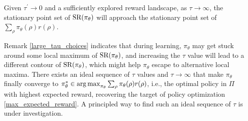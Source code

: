 \begin{remk}
\label{large_tau_choices}
	Given $\tau^{\prime} \to 0$ and a sufficiently explored reward landscape, as $\tau \to \infty$, the stationary point set of $\text{SR}(\pi_\theta)$ will approach the stationary point set of $\sum_{\rho}{ \pi_\theta(\rho) r(\rho) }$.
\end{remk}
 
Remark \ref{large_tau_choices} indicates that during learning, $\pi_\theta$ may get stuck around some local maximum of $\text{SR}(\pi_\theta)$, and increasing the $\tau$ value will lead to a different contour of $\text{SR}(\pi_\theta)$, which might help $\pi_\theta$ escape to alternative local maxima. There exists an ideal sequence of $\tau$ values and $\tau \to \infty$ that make $\pi_\theta$ finally converge to $\pi_\theta^* \in \operatorname*{arg\,max}_{\pi_\theta}{ \sum_{\rho}{\pi_\theta(\rho) r(\rho)} }$, i.e., the optimal policy in $\Pi$ with highest expected reward, recovering the target of policy optimization \cref{max_expected_reward}. A principled way to find such an ideal sequence of $\tau$ is under investigation.
 \fi
 
